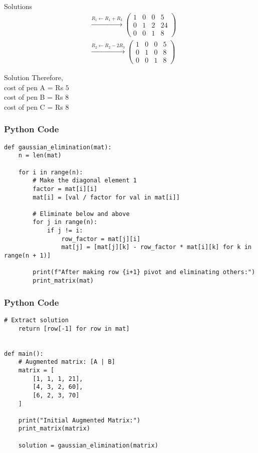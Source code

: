 \documentclass{beamer}
\begin{document}
\begin{frame}{Solutions}
   \begin{align}
       &\xrightarrow{R_1 \gets R_1 + R_3}
\left(
\begin{array}{ccc|c}
1 & 0 & 0 & 5 \\
0 & 1 & 2 & 24 \\
0 & 0 & 1 & 8
\end{array}
\right) \\[12pt]
&\xrightarrow{R_2 \gets R_2 - 2R_3}
\left(
\begin{array}{ccc|c}
1 & 0 & 0 & 5 \\
0 & 1 & 0 & 8 \\
0 & 0 & 1 & 8
\end{array}
\right)
   \end{align} 
\end{frame}
\begin{frame}{Solution}
    Therefore,\\
          cost of pen A = Rs $5$\\
          cost of pen B = Rs $8$\\
          cost of pen C = Rs $8$
\end{frame}

\begin{frame}[fragile]
    \frametitle{Python Code}
    \begin{lstlisting}
def gaussian_elimination(mat):
    n = len(mat)

    for i in range(n):
        # Make the diagonal element 1
        factor = mat[i][i]
        mat[i] = [val / factor for val in mat[i]]

        # Eliminate below and above
        for j in range(n):
            if j != i:
                row_factor = mat[j][i]
                mat[j] = [mat[j][k] - row_factor * mat[i][k] for k in range(n + 1)]

        print(f"After making row {i+1} pivot and eliminating others:")
        print_matrix(mat)

\end{lstlisting}
\end{frame}

\begin{frame}[fragile]
    \frametitle{Python Code}

    \begin{lstlisting}
# Extract solution
    return [row[-1] for row in mat]


def main():
    # Augmented matrix: [A | B]
    matrix = [
        [1, 1, 1, 21],
        [4, 3, 2, 60],
        [6, 2, 3, 70]
    ]

    print("Initial Augmented Matrix:")
    print_matrix(matrix)

    solution = gaussian_elimination(matrix)


    \end{lstlisting}
\end{frame}
\end{document}
